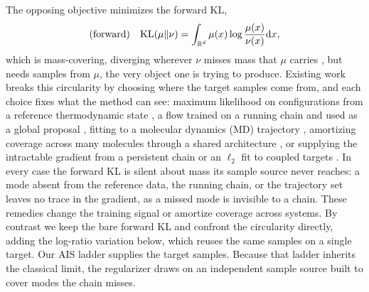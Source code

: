 \documentclass{article}
\begin{document}
The opposing objective minimizes the forward KL,
\begin{equation}
    \text{(forward)}\quad \mathrm{KL}(\mu\|\nu) = \int_{\mathbb R^d} \mu(x) \log \frac{\mu(x)}{\nu(x)} \mathrm{d} x,
    \label{eq: forward KL}
\end{equation}
which is mass-covering, diverging wherever $\nu$ misses mass that $\mu$ carries \citep{wainwright2008graphical}, but needs samples from $\mu$, the very object one is trying to produce. Existing work breaks this circularity by choosing where the target samples come from, and each choice fixes what the method can see: maximum likelihood on configurations from a reference thermodynamic state \citep{wirnsberger2020targeted}, a flow trained on a running chain and used as a global proposal \citep{gabrie2022adaptive}, fitting to a molecular dynamics (MD) trajectory \citep{klein2023equivariant}, amortizing coverage across many molecules through a shared architecture \citep{klein2024transferable}, or supplying the intractable gradient from a persistent chain or an $\ell_2$ fit to coupled targets \citep{naesseth2020markovian,rehman2026regflow}. In every case the forward KL is silent about mass its sample source never reaches: a mode absent from the reference data, the running chain, or the trajectory set leaves no trace in the gradient, as a missed mode is invisible to a chain. These remedies change the training signal or amortize coverage across systems. By contrast we keep the bare forward KL and confront the circularity directly, adding the log-ratio variation below, which reuses the same samples on a single target. Our AIS ladder supplies the target samples. Because that ladder inherits the classical limit, the regularizer draws on an independent sample source built to cover modes the chain misses.
\end{document}
